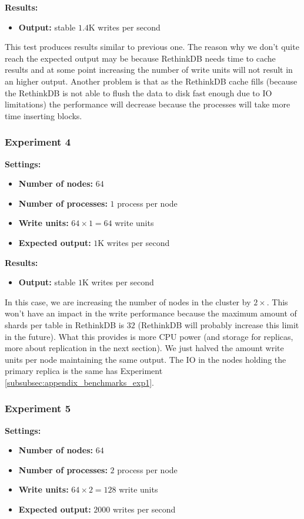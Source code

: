 \medskip
\noindent\textbf{Results:}
\begin{itemize}
 \item \textbf{Output:} stable $1.4$K writes per second
\end{itemize}

This test produces results similar to previous one. 
The reason why we don't quite reach the expected output may be because RethinkDB needs time to cache results and at some point increasing the number of write units will not result in an higher output. 
Another problem is that as the RethinkDB cache fills (because the RethinkDB is not able to flush the data to disk fast enough due to IO limitations) the performance will decrease because the processes will take more time inserting blocks. 

\subsubsection{Experiment 4}\label{subsubsec:appendix_benchmarks_exp4}
\medskip
\noindent\textbf{Settings:}
\begin{itemize}
 \item \textbf{Number of nodes:} $64$
 \item \textbf{Number of processes:} $1$ process per node
 \item \textbf{Write units:} $64 \times 1 = 64$ write units
 \item \textbf{Expected output:} $1$K writes per second
\end{itemize}

\medskip
\noindent\textbf{Results:}
\begin{itemize}
 \item \textbf{Output:} stable $1$K writes per second
\end{itemize}

In this case, we are increasing the number of nodes in the cluster by $2\times$. 
This won't have an impact in the write performance because the maximum amount of shards per table in RethinkDB is $32$ (RethinkDB will probably increase this limit in the future).
What this provides is more CPU power (and storage for replicas, more about replication in the next section). 
We just halved the amount write units per node maintaining the same output. 
The IO in the nodes holding the primary replica is the same has Experiment \ref{subsubsec:appendix_benchmarks_exp1}. 

\subsubsection{Experiment 5}\label{subsubsec:appendix_benchmarks_exp5}
\medskip
\noindent\textbf{Settings:}
\begin{itemize}
 \item \textbf{Number of nodes:} $64$
 \item \textbf{Number of processes:} $2$ process per node
 \item \textbf{Write units:} $64 \times 2 = 128$ write units
 \item \textbf{Expected output:} $2000$ writes per second
\end{itemize}

